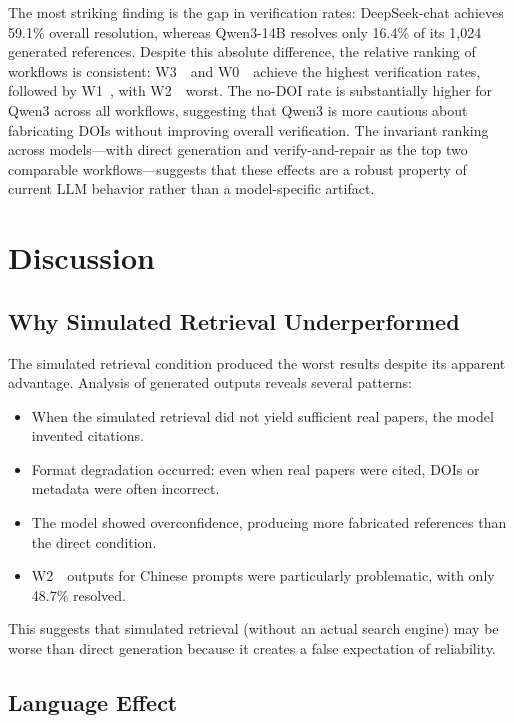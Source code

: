 \documentclass[11pt,a4paper]{article}
\newcommand{\wzero}{W0~}
\newcommand{\wone}{W1~}
\newcommand{\wtwo}{W2~}
\newcommand{\wthree}{W3~}
\begin{document}
The most striking finding is the gap in verification rates: DeepSeek-chat achieves 59.1\% overall resolution, whereas Qwen3-14B resolves only 16.4\% of its 1,024 generated references. Despite this absolute difference, the relative ranking of workflows is consistent: \wthree~and \wzero~achieve the highest verification rates, followed by \wone, with \wtwo~worst. The no-DOI rate is substantially higher for Qwen3 across all workflows, suggesting that Qwen3 is more cautious about fabricating DOIs without improving overall verification. The invariant ranking across models---with direct generation and verify-and-repair as the top two comparable workflows---suggests that these effects are a robust property of current LLM behavior rather than a model-specific artifact.

\section{Discussion}
\label{sec:discussion}

\subsection{Why Simulated Retrieval Underperformed}

The simulated retrieval condition produced the worst results despite its apparent advantage. Analysis of generated outputs reveals several patterns:

\begin{itemize}[nosep]
    \item When the simulated retrieval did not yield sufficient real papers, the model invented citations.
    \item Format degradation occurred: even when real papers were cited, DOIs or metadata were often incorrect.
    \item The model showed overconfidence, producing more fabricated references than the direct condition.
    \item \wtwo~outputs for Chinese prompts were particularly problematic, with only 48.7\% resolved.
\end{itemize}

This suggests that simulated retrieval (without an actual search engine) may be worse than direct generation because it creates a false expectation of reliability.

\subsection{Language Effect}
\end{document}
